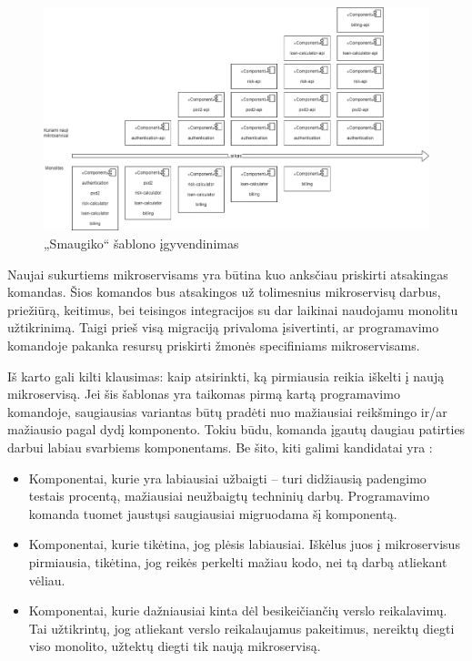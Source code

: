 \documentclass[fleqn]{VUMIFPSkursinis}
\begin{document}
\begin{figure}[H]
    \centering
    \includegraphics{img/smaugiko-sablonas.png}
    \caption{„Smaugiko“ šablono įgyvendinimas}
    \label{img:smaugiko-sablonas}
\end{figure}

Naujai sukurtiems mikroservisams yra būtina kuo anksčiau priskirti atsakingas komandas. Šios komandos bus atsakingos už tolimesnius mikroservisų darbus, priežiūrą, keitimus, bei teisingos integracijos su dar laikinai naudojamu monolitu užtikrinimą. Taigi prieš visą migraciją privaloma įsivertinti, ar programavimo komandoje pakanka resursų priskirti žmonės specifiniams mikroservisams.

Iš karto gali kilti klausimas: kaip atsirinkti, ką pirmiausia reikia iškelti į naują mikroservisą. Jei šis šablonas yra taikomas pirmą kartą programavimo komandoje, saugiausias variantas būtų pradėti nuo mažiausiai reikšmingo ir/ar mažiausio pagal dydį komponento. Tokiu būdu, komanda įgautų daugiau patirties darbui labiau svarbiems komponentams. Be šito, kiti galimi kandidatai yra \cite{Beh18}:
\begin{itemize}
    \item Komponentai, kurie yra labiausiai užbaigti – turi didžiausią padengimo testais procentą, mažiausiai neužbaigtų techninių darbų. Programavimo komanda tuomet jaustųsi saugiausiai migruodama šį komponentą.
    \item Komponentai, kurie tikėtina, jog plėsis labiausiai. Iškėlus juos į mikroservisus pirmiausia, tikėtina, jog reikės perkelti mažiau kodo, nei tą darbą atliekant vėliau.
    \item Komponentai, kurie dažniausiai kinta dėl besikeičiančių verslo reikalavimų. Tai užtikrintų, jog atliekant verslo reikalaujamus pakeitimus, nereiktų diegti viso monolito, užtektų diegti tik naują mikroservisą.
\end{itemize}
\end{document}
